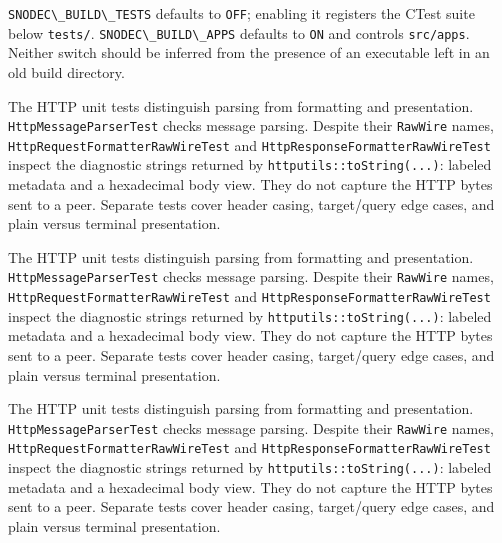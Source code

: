 \documentclass[
  a4paper,
  openany]{book}
\providecommand{\passthrough}[1]{#1}
\begin{document}
\passthrough{\lstinline!SNODEC\_BUILD\_TESTS!} defaults to
\passthrough{\lstinline!OFF!}; enabling it registers the CTest suite
below \passthrough{\lstinline!tests/!}.
\passthrough{\lstinline!SNODEC\_BUILD\_APPS!} defaults to
\passthrough{\lstinline!ON!} and controls
\passthrough{\lstinline!src/apps!}. Neither switch should be inferred
from the presence of an executable left in an old build directory.\par
\clearpage
{}
The HTTP unit tests distinguish parsing from formatting and
presentation. \passthrough{\lstinline!HttpMessageParserTest!} checks
message parsing. Despite their \passthrough{\lstinline!RawWire!} names,
\passthrough{\lstinline!HttpRequestFormatterRawWireTest!} and
\passthrough{\lstinline!HttpResponseFormatterRawWireTest!} inspect the
diagnostic strings returned by
\passthrough{\lstinline!httputils::toString(...)!}: labeled metadata and
a hexadecimal body view. They do not capture the HTTP bytes sent to a
peer. Separate tests cover header casing, target/query edge cases, and
plain versus terminal presentation.\par
\clearpage
{}
The HTTP unit tests distinguish parsing from formatting and
presentation. \passthrough{\lstinline!HttpMessageParserTest!} checks
message parsing. Despite their \passthrough{\lstinline!RawWire!} names,
\passthrough{\lstinline!HttpRequestFormatterRawWireTest!} and
\passthrough{\lstinline!HttpResponseFormatterRawWireTest!} inspect the
diagnostic strings returned by
\passthrough{\lstinline!httputils::toString(...)!}: labeled metadata and
a hexadecimal body view. They do not capture the HTTP bytes sent to a
peer. Separate tests cover header casing, target/query edge cases, and
plain versus terminal presentation.\par
\clearpage
{}
The HTTP unit tests distinguish parsing from formatting and
presentation. \passthrough{\lstinline!HttpMessageParserTest!} checks
message parsing. Despite their \passthrough{\lstinline!RawWire!} names,
\passthrough{\lstinline!HttpRequestFormatterRawWireTest!} and
\passthrough{\lstinline!HttpResponseFormatterRawWireTest!} inspect the
diagnostic strings returned by
\passthrough{\lstinline!httputils::toString(...)!}: labeled metadata and
a hexadecimal body view. They do not capture the HTTP bytes sent to a
peer. Separate tests cover header casing, target/query edge cases, and
plain versus terminal presentation.\par
\clearpage
\end{document}

